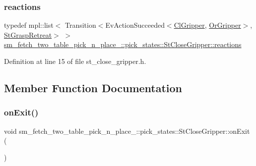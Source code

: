 \subsubsection{\texorpdfstring{reactions}{reactions}}
{\footnotesize\ttfamily typedef mpl\+::list$<$ Transition$<$Ev\+Action\+Succeeded$<$\hyperlink{classsm__fetch__two__table__pick__n__place__1_1_1cl__gripper_1_1ClGripper}{Cl\+Gripper}, \hyperlink{classsm__fetch__two__table__pick__n__place__1_1_1OrGripper}{Or\+Gripper}$>$, \hyperlink{structsm__fetch__two__table__pick__n__place__1_1_1pick__states_1_1StGraspRetreat}{St\+Grasp\+Retreat}$>$ $>$ \hyperlink{structsm__fetch__two__table__pick__n__place__1_1_1pick__states_1_1StCloseGripper_a767854cf0c9c0e8489cbae35c8e21b9f}{sm\+\_\+fetch\+\_\+two\+\_\+table\+\_\+pick\+\_\+n\+\_\+place\+\_\+::pick\+\_\+states\+::\+St\+Close\+Gripper\+::reactions}}



Definition at line 15 of file st\+\_\+close\+\_\+gripper.\+h.



\subsection{Member Function Documentation}
\mbox{\label{structsm__fetch__two__table__pick__n__place__1_1_1pick__states_1_1StCloseGripper_adce3130d68e84e5432884872170e789f}} 
\subsubsection{\texorpdfstring{on\+Exit()}{onExit()}}
{\footnotesize\ttfamily void sm\+\_\+fetch\+\_\+two\+\_\+table\+\_\+pick\+\_\+n\+\_\+place\+\_\+::pick\+\_\+states\+::\+St\+Close\+Gripper\+::on\+Exit (\begin{DoxyParamCaption}{ }\end{DoxyParamCaption})\hspace{0.3cm}{\ttfamily [inline]}}



